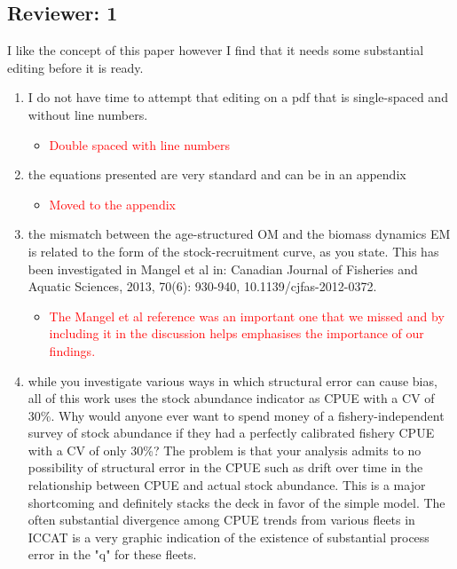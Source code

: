 \documentclass[a4paper,10pt]{article}
\newcommand{\red}{\textcolor{red}}
\begin{document}
\subsection*{Reviewer: 1}

I like the concept of this paper however I find that it needs some substantial editing before it is ready. 


\begin{enumerate}
 \item I do not have time to attempt that editing on a pdf that is single-spaced and without line numbers.
  \begin{itemize}
    \item \red{Double spaced with line numbers}
  \end{itemize}
 \item  the equations presented are very standard and can be in an appendix
  \begin{itemize}
    \item \red{Moved to the appendix}
  \end{itemize}

 \item  the mismatch between the age-structured OM and the biomass dynamics EM is related to the form of the stock-recruitment curve, as you state.  This has been investigated in Mangel et al in:  Canadian Journal of Fisheries and Aquatic Sciences, 2013, 70(6): 930-940, 10.1139/cjfas-2012-0372.
  \begin{itemize}
    \item \red{The Mangel et al reference was an important one that we missed and by including it in the discussion helps emphasises the importance of our findings.}
  \end{itemize}

 \item while you investigate various ways in which structural error can cause bias, all of this work uses the stock abundance indicator as CPUE with a CV of 30\%.  Why would anyone ever want to spend money of a fishery-independent survey of stock abundance if they had a perfectly calibrated fishery CPUE with a CV of only 30\%?  The problem is that your analysis admits to no possibility of structural error in the CPUE such as drift over time in the relationship between CPUE and actual stock abundance.  This is a major shortcoming and definitely stacks the deck in favor of the simple model.  The often substantial divergence among CPUE trends from various fleets in ICCAT is a very graphic indication of the existence of substantial process error in the "q" for these fleets.
  

\end{enumerate}
\end{document}
